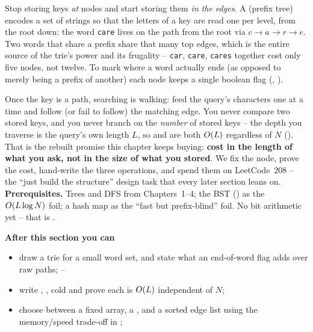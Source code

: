 \begin{topicintro}
Stop storing keys \emph{at} nodes and start storing them \emph{in the edges}. A  (prefix tree)
encodes a set of strings so that the letters of a key are read one per level, from the root down: the
word \texttt{care} lives on the path from the root via $c\!\to\!a\!\to\!r\!\to\!e$. Two words that share a prefix share that many top edges, which is the entire source of
the trie's power and its frugality -- \texttt{car}, \texttt{care}, \texttt{cares} together cost only
five nodes, not twelve. To mark where a word actually ends (as opposed to merely being a prefix of
another) each node keeps a single boolean  flag (,
).

Once the key is a path, searching is walking: feed the query's characters one at a time and follow (or
fail to follow) the matching edge. You never compare two stored keys, and you never branch on the
\emph{number} of stored keys -- the depth you traverse is the query's own length $L$, so 
and  are both $O(L)$ regardless of $N$ (). That is the
rebuilt promise this chapter keeps buying: \textbf{cost in the length of what you ask, not in the size
of what you stored}. We fix the node, prove the cost, hand-write the three operations, and spend them
on LeetCode~208 -- the ``just build the structure'' design task that every later section leans on.
\textbf{Prerequisites.} Trees and DFS from Chapters~1--4; the BST () as the $O(L\log N)$
foil; a hash map as the ``fast but prefix-blind'' foil. No bit arithmetic yet -- that is .

\textbf{After this section you can}
\begin{itemize}[nosep]
  \item draw a trie for a small word set, and state what an end-of-word flag adds over raw paths;
        \hfill{}--
  \item write , ,  cold and prove each is $O(L)$
        independent of $N$; \hfill{}
  \item choose between a fixed  array, a , and a sorted edge list using the
        memory/speed trade-off in ; \hfill{}
\end{itemize}
\end{topicintro}

